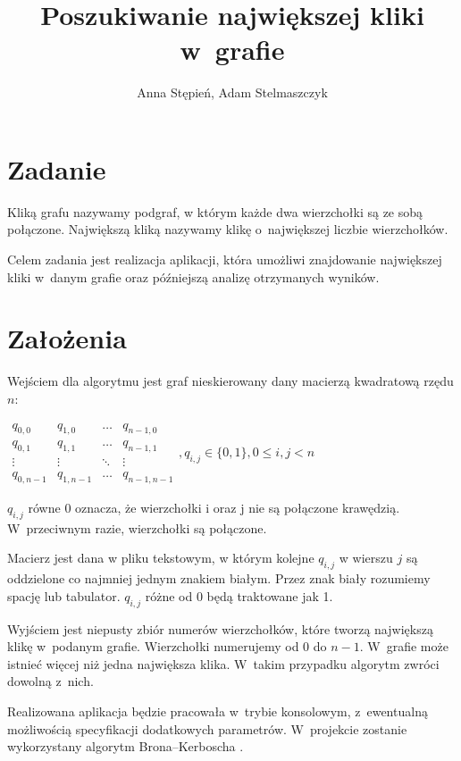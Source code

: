 \documentclass[12pt, a4paper]{article}
\title{\textbf{Poszukiwanie największej kliki w~grafie}}
\author{Anna Stępień, Adam Stelmaszczyk}
\date{}
\begin{document}
\maketitle

\section{Zadanie}

Kliką grafu nazywamy podgraf, w którym każde dwa wierzchołki są ze sobą połączone.
Największą kliką nazywamy klikę o~największej liczbie wierzchołków.

Celem zadania jest realizacja aplikacji, która umożliwi znajdowanie największej kliki w~danym grafie oraz późniejszą analizę otrzymanych wyników.

\section{Założenia}

Wejściem dla algorytmu jest graf nieskierowany dany macierzą kwadratową rzędu $n$:

\bigskip
$ 
\begin{array}{cccc}
q_{0,0} & q_{1,0} & \ldots & q_{n-1,0} \\
q_{0,1} & q_{1,1} & \ldots & q_{n-1,1} \\
\vdots  & \vdots  & \ddots & \vdots  \\
q_{0,n-1} & q_{1,n-1} & \ldots & q_{n-1,n-1} 
\end{array}
, q_{i,j} \in \{0,1\}, 0 \leq i,j < n
$
\bigskip

$q_{i,j}$ równe 0 oznacza, że wierzchołki i oraz j nie są połączone krawędzią. W~przeciwnym razie, wierzchołki są połączone.
\par\vspace{\baselineskip}
Macierz jest dana w pliku tekstowym, w którym kolejne $q_{i,j}$ w wierszu $j$ są oddzielone co najmniej jednym znakiem białym. 
Przez znak biały rozumiemy spację lub tabulator. $q_{i,j}$ różne od 0 będą traktowane jak 1.
\par\vspace{\baselineskip}
Wyjściem jest niepusty zbiór numerów wierzchołków, które tworzą największą klikę w~podanym grafie. 
Wierzchołki numerujemy od 0 do $n-1$. W~grafie może istnieć więcej niż jedna największa klika.
W~takim przypadku algorytm zwróci dowolną z~nich.

Realizowana aplikacja będzie pracowała w~trybie konsolowym, z~ewentualną możliwością specyfikacji dodatkowych parametrów.
W~projekcie zostanie wykorzystany algorytm Brona--Kerboscha \cite{bk}.



\end{document}
